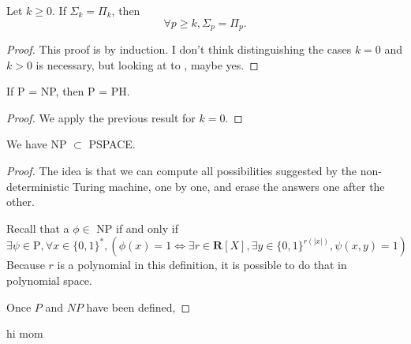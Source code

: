 \begin{proposition}
    Let $ k \ge 0 $.
    If $ \Sigma_k = \Pi_k $, then
    \[
        \forall p \ge k, \Sigma_p = \Pi_p.
    \]
\end{proposition}

\begin{proof}
    This proof is by induction. I don't think distinguishing the cases $ k = 0 $ and $ k > 0 $ is necessary, but looking at to \cite{gowers2024}, maybe yes.
\end{proof}

\begin{corollary}
    If P = NP, then P = PH.
\end{corollary}

\begin{proof}
    We apply the previous result for $ k = 0 $.
\end{proof}

\begin{proposition}
    We have NP $ \subset $ PSPACE.
\end{proposition}

\begin{proof}
    The idea is that we can compute all possibilities suggested by the non-deterministic Turing machine, one by one, and erase the answers one after the other.

    Recall that a $ \phi \in $ NP if and only if
    \[
        \exists \psi \in \mathrm P, \forall x \in \{ 0,1 \}^*, ( \phi(x) = 1 \iff \exists r \in \mathbf R[X], \exists y \in \{ 0,1 \}^{r(|x|)}, \psi(x,y) = 1)
    \]
    Because $ r $ is a polynomial in this definition, it is possible to do that in polynomial space.


Once $P$ and $NP$ have been defined,
\end{proof}

\begin{problem}
    hi mom
\end{problem}